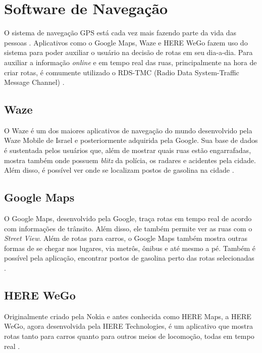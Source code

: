 \section{Software de Navegação}

O sistema de navegação GPS está cada vez mais fazendo parte da vida das pessoas \cite{gps-1}. Aplicativos como o Google Maps, Waze e HERE WeGo fazem uso do sistema para poder auxiliar o usuário na decisão de rotas em seu dia-a-dia. Para auxiliar a informação \textit{online} e em tempo real das ruas, principalmente na hora de criar rotas, é comumente utilizado o RDS-TMC (Radio Data System-Traffic Message Channel) \cite{rds-tmc}. 

\subsection{Waze}
O Waze é um dos maiores aplicativos de navegação do mundo desenvolvido pela Waze Mobile de Israel e posteriormente adquirida pela Google. Sua base de dados é sustentada pelos usuários que, além de mostrar quais ruas estão engarrafadas, mostra também onde possuem \textit{blitz} da polícia, os radares e acidentes pela cidade. Além disso, é possível ver onde se localizam postos de gasolina na cidade \cite{waze}.

\subsection{Google Maps}
O Google Maps, desenvolvido pela Google, traça rotas em tempo real de acordo com informações de trânsito. Além disso, ele também permite ver as ruas com o \textit{Street View}. Além de rotas para carros, o Google Maps também mostra outras formas de se chegar nos lugares, via metrôs, ônibus e até mesmo a pé. Também é possível pela aplicação, encontrar postos de gasolina perto das rotas selecionadas \cite{google-maps}. 

\subsection{HERE WeGo}
Originalmente criado pela Nokia e antes conhecida como HERE Maps, a HERE WeGo, agora desenvolvida pela HERE Technologies, é um aplicativo que mostra rotas tanto para carros quanto para outros meios de locomoção, todas em tempo real \cite{herewego}.
